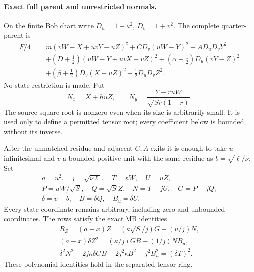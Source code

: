 \paragraph{Exact full parent and unrestricted normals.}
On the finite Bob chart write $D_u=1+u^2$, $D_v=1+v^2$.
The complete quarter-parent is
\[
\begin{split}
 F/4={}&m(vW-X+uvY-uZ)^2+C D_v(uW-Y)^2+A D_uD_vY^2\\
 &+(D+\tfrac12)(uW-Y+uvX-vZ)^2
 +(\alpha+\tfrac12)D_u(vY-Z)^2\\
 &+(\beta+\tfrac12)D_v(X+uZ)^2-\tfrac12D_uD_vZ^2.
\end{split}\tag{FM5}
\]
No state restriction is made. Put
\[
 N_x=X+huZ,\qquad N_y=\frac{Y-ruW}{\sqrt{Sr(1-r)}}.
 \tag{FM6}
\]
The source square root is nonzero even when its size is arbitrarily
small. It is used only to define a permitted tensor root; every
coefficient below is bounded without its inverse.

After the unmatched-residue and adjacent-$C,A$ exits it is
enough to take $u$ infinitesimal and $v$ a bounded positive unit with
the same residue as $b=\sqrt{\ell/\nu}$. Set
\[
\begin{gathered}
 a=u^2,\quad j=\sqrt{\nu\ell},\quad T=\kappa W,\quad U=uZ,\\
 P=uW/\sqrt S,\quad Q=\sqrt S Z,\quad N=T-jU,\quad G=P-jQ,\\
 \delta=v-b,\quad B=\delta Q,\quad B_u=\delta U.
\end{gathered}
 \tag{FM7}
\]
Every state coordinate remains arbitrary, including zero and
unbounded coordinates. The rows satisfy the exact MB identities
\[
\begin{gathered}
 R_Z=(a-x)Z=(\kappa\sqrt S/j)G-(u/j)N,\\
 (a-x)\delta Z^2=(\kappa/j)GB-(1/j)NB_u,\\
 \delta^2N^2+2j\kappa\delta GB+2j^2\kappa B^2-j^2B_u^2
                  =(\delta T)^2.
\end{gathered}\tag{FM8}
\]
These polynomial identities hold in the separated tensor ring.

